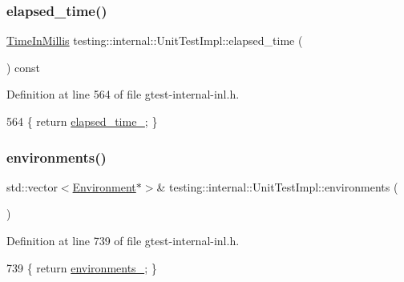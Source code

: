 \subsubsection{\texorpdfstring{elapsed\+\_\+time()}{elapsed\_time()}}
{\footnotesize\ttfamily \hyperlink{namespacetesting_1_1internal_a66a845df404b38fe85c5e14a069f255a}{Time\+In\+Millis} testing\+::internal\+::\+Unit\+Test\+Impl\+::elapsed\+\_\+time (\begin{DoxyParamCaption}{ }\end{DoxyParamCaption}) const\hspace{0.3cm}{\ttfamily [inline]}}



Definition at line 564 of file gtest-\/internal-\/inl.\+h.


\begin{DoxyCode}
564 \{ \textcolor{keywordflow}{return} \hyperlink{classtesting_1_1internal_1_1UnitTestImpl_a06e0445298c6026bee71bb2bb7aae604}{elapsed\_time\_}; \}
\end{DoxyCode}
\mbox{\label{classtesting_1_1internal_1_1UnitTestImpl_aa1489e6a2378d64d68bc01963ea5db4a}} 
\subsubsection{\texorpdfstring{environments()}{environments()}}
{\footnotesize\ttfamily std\+::vector$<$\hyperlink{classtesting_1_1Environment}{Environment}$\ast$$>$\& testing\+::internal\+::\+Unit\+Test\+Impl\+::environments (\begin{DoxyParamCaption}{ }\end{DoxyParamCaption})\hspace{0.3cm}{\ttfamily [inline]}}



Definition at line 739 of file gtest-\/internal-\/inl.\+h.


\begin{DoxyCode}
739 \{ \textcolor{keywordflow}{return} \hyperlink{classtesting_1_1internal_1_1UnitTestImpl_a1d2320ba1e4e1cad8d624bbb222501fb}{environments\_}; \}
\end{DoxyCode}
\mbox{\label{classtesting_1_1internal_1_1UnitTestImpl_a0c95d1b56b5f33057afc516db05ac313}} 
